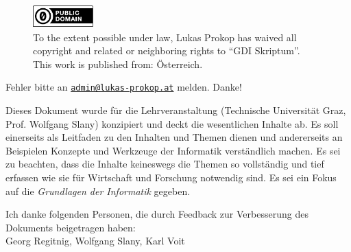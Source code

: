 \begin{titlepage}
  \begin{center}
    \begin{figure}[ht!]
      \begin{center}
        \includegraphics[width=88px,height=33px]{img/cc0.pdf} \\[20pt]%
        To the extent possible under law, Lukas Prokop has waived all copyright and related
        or neighboring rights to ``GDI Skriptum''. \\
        This work is published from: Österreich. 
      \end{center}
    \end{figure}
    \vspace{50pt}
    \noindent Fehler bitte an
    \href{mailto:admin@lukas-prokop.at}{\nolinkurl{admin@lukas-prokop.at}}
    melden. Danke!
    \vspace{50pt}

    Dieses Dokument wurde für die Lehrveranstaltung \courselfocs{}
    (Technische Universität Graz, Prof. Wolfgang Slany) konzipiert
    und deckt die wesentlichen Inhalte ab. Es soll einerseits als
    Leitfaden zu den Inhalten und Themen dienen und andererseits an Beispielen
    Konzepte und Werkzeuge der Informatik verständlich machen. Es sei zu beachten,
    dass die Inhalte keineswegs die Themen so vollständig und tief erfassen
    wie sie für Wirtschaft und Forschung notwendig sind. Es sei ein Fokus
    auf die \emph{Grundlagen der Informatik} gegeben.

    \vspace{50pt}
    Ich danke folgenden Personen, die durch Feedback zur Verbesserung
    des Dokuments beigetragen haben: \\[15pt]
    Georg Regitnig, Wolfgang Slany, Karl Voit
  \end{center}
\end{titlepage}


